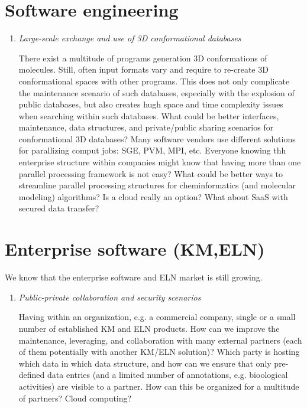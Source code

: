 \documentclass{sig-alternate}
\begin{document}
\section*{Software engineering}
\begin{enumerate}
\item \emph{Large-scale exchange and use of 3D conformational databases}

There exist a multitude of programs generation 3D conformations of molecules. Still, often input formats vary and require
to re-create 3D conformational spaces with other programs. This does not only complicate the maintenance scenario of such
databases, especially with the explosion of public databases, but also creates hugh space and time complexity issues when
searching within such databases. What could be better interfaces, maintenance, data structures, and private/public sharing
scenarios for conformational 3D databases? 
Many software vendors use different solutions for parallizing comput jobs: SGE, PVM, MPI, etc. 
Everyone knowing thh enterprise structure within companies might know that having more than one parallel processing framework 
is not easy? What could be better ways to streamline parallel processing structures for 
cheminformatics (and molecular modeling) algorithms? Is a cloud really an option? What about SaaS with secured data transfer?
\end{enumerate}

\section*{Enterprise software (KM,ELN)}
We know that the enterprise software and ELN market is still growing.
\begin{enumerate}
\item \emph{Public-private collaboration and security scenarios}

Having within an organization, e.g. a commercial company, single or a small number of established KM and ELN products. 
How can we improve the maintenance, leveraging, and collaboration with many external partners (each of them potentially
with another KM/ELN solution)? Which party is hosting which data in which data structure, and how can we ensure that only
pre-defined data entries (and a limited number of annotations, e.g. bioological activities) are visible to a partner.
How can this be organized for a multitude of partners? Cloud computing?
\end{enumerate}



\end{document}
